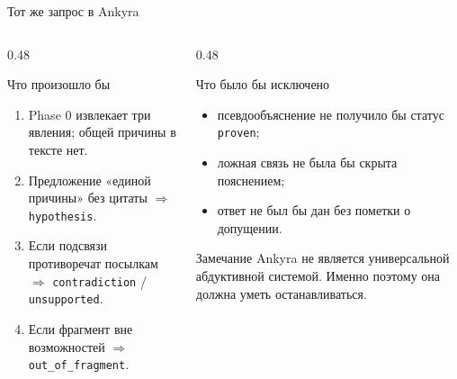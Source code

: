 \documentclass[aspectratio=169,11pt]{beamer}
\newcommand{\Hyp}[1]{\textcolor{hypocolor}{#1}}
\newcommand{\Rej}[1]{\textcolor{rejectcolor}{#1}}
\begin{document}
\begin{frame}{Тот же запрос в Ankyra}
  \footnotesize
  \begin{columns}[T,onlytextwidth]
    \begin{column}{0.48\textwidth}
      \begin{block}{Что произошло бы}
        \begin{enumerate}
          \item Phase 0 извлекает три явления; общей причины в тексте нет.
          \item Предложение «единой причины» без цитаты
                \(\Rightarrow\) \Hyp{\texttt{hypothesis}}.
          \item Если подсвязи противоречат посылкам
                \(\Rightarrow\) \texttt{contradiction} / \texttt{unsupported}.
          \item Если фрагмент вне возможностей
                \(\Rightarrow\) \Rej{\texttt{out\_of\_fragment}}.
        \end{enumerate}
      \end{block}
    \end{column}
    \begin{column}{0.48\textwidth}
      \begin{block}{Что было бы исключено}
        \begin{itemize}
          \item псевдообъяснение не получило бы статус \texttt{proven};
          \item ложная связь не была бы скрыта пояснением;
          \item ответ не был бы дан без пометки о допущении.
        \end{itemize}
      \end{block}

      \vspace{2mm}
      \begin{block}{Замечание}
        Ankyra не является универсальной абдуктивной системой.
        Именно поэтому она должна уметь останавливаться.
      \end{block}
    \end{column}
  \end{columns}
\end{frame}
\end{document}
